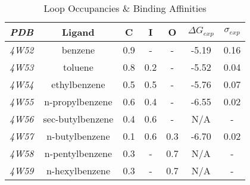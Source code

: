 \documentclass[T4paper.tex]{subfiles}
\begin{document}
\begin{table}[!htb]
\centering
\caption{Loop Occupancies \& Binding Affinities \cite{Merski2015,T4affinity}}
\label{tbl:expdata}
\begin{tabular}{|c|c|c|c|c|c|c|}
\hline
\textit{\textbf{PDB}} &  \textbf{Ligand}  & \textbf{C} & \textbf{I} & \textbf{O} & \boldmath$\Delta G_{exp}$  & \boldmath$\sigma_{exp}$  \\ \hline
\textit{4W52}    &  \cellcolor[HTML]{800080} benzene           & \cellcolor[HTML]{C0C0C0}0.9    & -     & -    & -5.19      & 0.16          \\ \hline
\textit{4W53}    &  \cellcolor[HTML]{800080} toluene           & \cellcolor[HTML]{C0C0C0}0.8    & 0.2   & -    & -5.52      & 0.04          \\ \hline
\textit{4W54}    &  \cellcolor[HTML]{800080} ethylbenzene      & \cellcolor[HTML]{C0C0C0}0.5    & 0.5   & -    & -5.76      & 0.07          \\ \hline
\textit{4W55}    &  \cellcolor[HTML]{800080} n-propylbenzene   & \cellcolor[HTML]{C0C0C0}0.6    & 0.4   & -    & -6.55      & 0.02          \\ \hline
\textit{4W56}    &  \cellcolor[HTML]{00FFFF} sec-butylbenzene  & 0.4        & \cellcolor[HTML]{C0C0C0}0.6      & -    & N/A      & -         \\ \hline
\textit{4W57}    &   \cellcolor[HTML]{00FFFF} n-butylbenzene   & 0.1        & \cellcolor[HTML]{C0C0C0}0.6      & 0.3   & -6.70   & 0.02       \\ \hline
\textit{4W58}    &   \cellcolor[HTML]{008000} n-pentylbenzene  & 0.3        &  -       & \cellcolor[HTML]{C0C0C0}0.7  & N/A     & -          \\ \hline
\textit{4W59}    &   \cellcolor[HTML]{008000} n-hexylbenzene   & 0.3        &  -       & \cellcolor[HTML]{C0C0C0}0.7  & N/A     & -     \\ \hline
\end{tabular}
\end{table}
\end{document}
